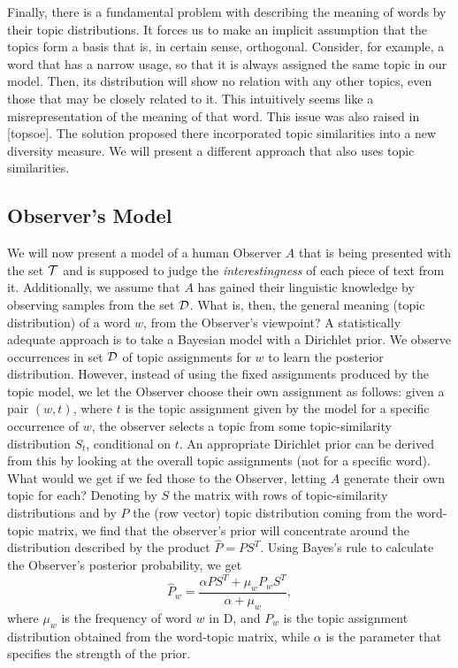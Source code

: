 Finally, there is a fundamental problem with describing the meaning of
words by their topic distributions. It forces us to make an implicit
assumption that the topics form a basis that is, in certain sense,
orthogonal. Consider, for example, a word that has a narrow usage, so
that it is always assigned the same topic in our model. Then, its
distribution will show no relation with any other topics, even those
that may be closely related to it. This intuitively seems like a
misrepresentation of the meaning of that word. This issue was also
raised in [topsoe]. The solution proposed there incorporated topic
similarities into a new diversity measure. We will present a different
approach that also uses topic similarities.

\subsection{Observer's Model}

We will now present a model of a human Observer $A$ that is being presented with
the set ${\mathcal T}$ and is supposed to judge the {\em interestingness} of
each piece of text from it. Additionally, we assume that $A$ has
gained their linguistic knowledge by observing samples from the set
${\mathcal D}$. What is, then, the general meaning (topic distribution) of a word $w$,
from the Observer's viewpoint? A statistically adequate approach is to
take a Bayesian model with a Dirichlet prior. We observe occurrences
in set ${\mathcal D}$ of topic assignments for $w$ to learn the posterior
distribution. However, instead of using the fixed assignments produced
by the topic model, we let the Observer choose their own assignment as
follows: given a pair $(w,t)$, where $t$ is the topic assignment given
by the model for a specific occurrence of $w$, the observer selects a
topic from some topic-similarity distribution $S_t$, conditional on
$t$. An appropriate Dirichlet prior can be derived from this by
looking at the overall topic assignments (not for a specific
word). What would we get if we fed those to the Observer, letting $A$
generate their own topic for each?  Denoting by $S$ the matrix with
rows of topic-similarity distributions and by $P$ the (row vector) topic
distribution coming from the word-topic matrix, we find that the
observer's prior will concentrate around the distribution described by
the product $\widehat{P}=PS^T$. Using Bayes's rule to calculate the Observer's
posterior probability, we get
\[\widehat{P}_w=\frac{\alpha PS^T + \mu_w P_wS^T}{\alpha+\mu_w},\]
where $\mu_w$ is the frequency of word $w$ in D, and $P_w$ is the
topic assignment distribution obtained from the word-topic matrix,
while $\alpha$ is the parameter that specifies the strength of the
prior.

